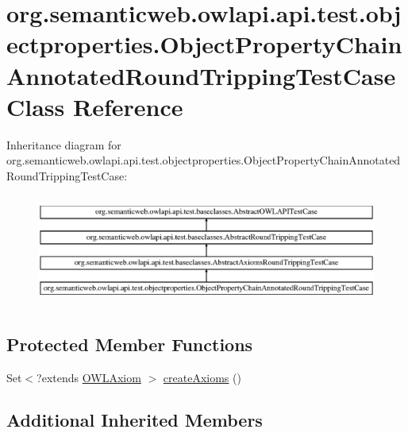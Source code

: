 \hypertarget{classorg_1_1semanticweb_1_1owlapi_1_1api_1_1test_1_1objectproperties_1_1_object_property_chain_a3a9fed56e257c1f8bd9b45bc96275449}{\section{org.\-semanticweb.\-owlapi.\-api.\-test.\-objectproperties.\-Object\-Property\-Chain\-Annotated\-Round\-Tripping\-Test\-Case Class Reference}
\label{classorg_1_1semanticweb_1_1owlapi_1_1api_1_1test_1_1objectproperties_1_1_object_property_chain_a3a9fed56e257c1f8bd9b45bc96275449}
}
Inheritance diagram for org.\-semanticweb.\-owlapi.\-api.\-test.\-objectproperties.\-Object\-Property\-Chain\-Annotated\-Round\-Tripping\-Test\-Case\-:\begin{figure}[H]
\begin{center}
\leavevmode
\includegraphics[height=3.684211cm]{classorg_1_1semanticweb_1_1owlapi_1_1api_1_1test_1_1objectproperties_1_1_object_property_chain_a3a9fed56e257c1f8bd9b45bc96275449}
\end{center}
\end{figure}
\subsection*{Protected Member Functions}
\begin{DoxyCompactItemize}
\item 
Set$<$?extends \hyperlink{interfaceorg_1_1semanticweb_1_1owlapi_1_1model_1_1_o_w_l_axiom}{O\-W\-L\-Axiom} $>$ \hyperlink{classorg_1_1semanticweb_1_1owlapi_1_1api_1_1test_1_1objectproperties_1_1_object_property_chain_a3a9fed56e257c1f8bd9b45bc96275449_ab1b440df7aefab4d968ca3122be5b05b}{create\-Axioms} ()
\end{DoxyCompactItemize}
\subsection*{Additional Inherited Members}


